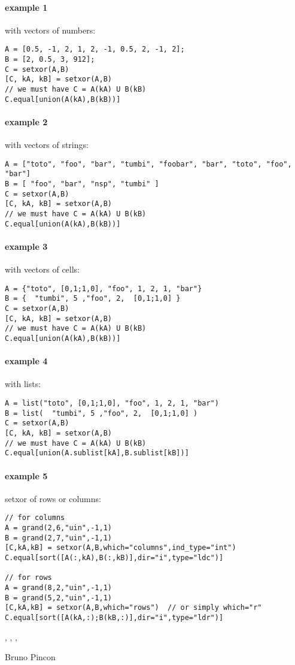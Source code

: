 \begin{examples}

\paragraph{example 1} with vectors of numbers:
\begin{Verbatim}
A = [0.5, -1, 2, 1, 2, -1, 0.5, 2, -1, 2];
B = [2, 0.5, 3, 912];
C = setxor(A,B)
[C, kA, kB] = setxor(A,B)
// we must have C = A(kA) U B(kB) 
C.equal[union(A(kA),B(kB))]
\end{Verbatim}

\paragraph{example 2} with vectors of strings:
\begin{Verbatim}
A = ["toto", "foo", "bar", "tumbi", "foobar", "bar", "toto", "foo", "bar"]
B = [ "foo", "bar", "nsp", "tumbi" ]
C = setxor(A,B)
[C, kA, kB] = setxor(A,B)
// we must have C = A(kA) U B(kB) 
C.equal[union(A(kA),B(kB))]
\end{Verbatim}

\paragraph{example 3} with vectors of cells:
\begin{Verbatim}
A = {"toto", [0,1;1,0], "foo", 1, 2, 1, "bar"}
B = {  "tumbi", 5 ,"foo", 2,  [0,1;1,0] }
C = setxor(A,B)
[C, kA, kB] = setxor(A,B)
// we must have C = A(kA) U B(kB) 
C.equal[union(A(kA),B(kB))]
\end{Verbatim}

\paragraph{example 4} with lists:
\begin{Verbatim}
A = list("toto", [0,1;1,0], "foo", 1, 2, 1, "bar")
B = list(  "tumbi", 5 ,"foo", 2,  [0,1;1,0] )
C = setxor(A,B)
[C, kA, kB] = setxor(A,B)
// we must have C = A(kA) U B(kB) 
C.equal[union(A.sublist[kA],B.sublist[kB])]
\end{Verbatim}

\paragraph{example 5} setxor of rows or columns:
\begin{Verbatim}
// for columns
A = grand(2,6,"uin",-1,1)
B = grand(2,7,"uin",-1,1)
[C,kA,kB] = setxor(A,B,which="columns",ind_type="int")
C.equal[sort([A(:,kA),B(:,kB)],dir="i",type="ldc")]

// for rows
A = grand(8,2,"uin",-1,1)
B = grand(5,2,"uin",-1,1)
[C,kA,kB] = setxor(A,B,which="rows")  // or simply which="r"
C.equal[sort([A(kA,:);B(kB,:)],dir="i",type="ldr")]

\end{Verbatim}

\end{examples}

\begin{manseealso}
  , , ,    
\end{manseealso}

\begin{authors}
  Bruno Pincon
\end{authors}
